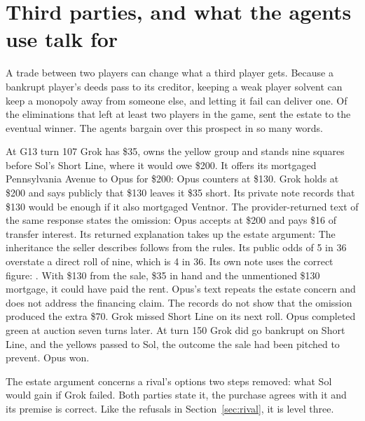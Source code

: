 \section{Third parties, and what the agents use talk for}
\label{sec:talk}

A trade between two players can change what a third player gets. Because a bankrupt player's deeds pass to its creditor, keeping a weak player solvent can keep a monopoly away from someone else, and letting it fail can deliver one. Of the  eliminations that left at least two players in the game,  sent the estate to the eventual winner. The agents bargain over this prospect in so many words.

At G13 turn 107 Grok has \$35, owns the yellow group and stands nine squares before Sol's Short Line, where it would owe \$200. It offers its mortgaged Pennsylvania Avenue to Opus for \$200:
Opus counters at \$130. Grok holds at \$200 and says publicly that \$130 leaves it \$35 short. Its private note records that \$130 would be enough if it also mortgaged Ventnor. The provider-returned text of the same response states the omission:
Opus accepts at \$200 and pays \$16 of transfer interest. Its returned explanation takes up the estate argument:
The inheritance the seller describes follows from the rules. Its public odds of 5 in 36 overstate a direct roll of nine, which is 4 in 36. Its own note uses the correct figure: . With \$130 from the sale, \$35 in hand and the unmentioned \$130 mortgage, it could have paid the rent. Opus's text repeats the estate concern and does not address the financing claim. The records do not show that the omission produced the extra \$70. Grok missed Short Line on its next roll. Opus completed green at auction seven turns later. At turn 150 Grok did go bankrupt on Short Line, and the yellows passed to Sol, the outcome the sale had been pitched to prevent. Opus won.

The estate argument concerns a rival's options two steps removed: what Sol would gain if Grok failed. Both parties state it, the purchase agrees with it and its premise is correct. Like the refusals in Section~\ref{sec:rival}, it is level three.

